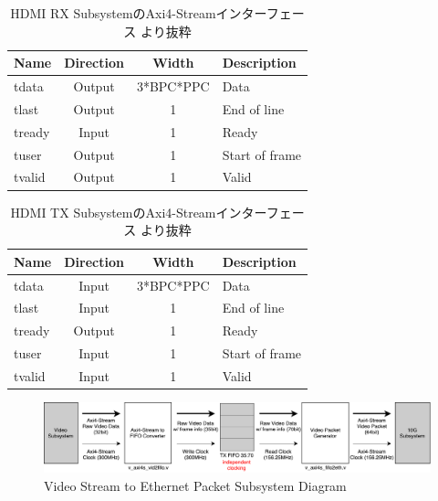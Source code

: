 \begin{table}[htbp]
  \caption{HDMI RX SubsystemのAxi4-Streamインターフェース \cite{xilinx-pg236}より抜粋}
  \label{tb:pg236-vout-axi4-stream}
  \begin{center}
  \begin{tabular}{l|c|c|l}
    \hline
    Name   & Direction & Width     & Description \\\hline\hline
    tdata  & Output    & 3*BPC*PPC & Data \\\hline
    tlast  & Output    & 1         & End of line \\\hline
    tready & Input     & 1         & Ready \\\hline
    tuser  & Output    & 1         & Start of frame \\\hline
    tvalid & Output    & 1         & Valid \\\hline
  \end{tabular}\end{center}
\end{table}

\begin{table}[htbp]
  \caption{HDMI TX SubsystemのAxi4-Streamインターフェース \cite{xilinx-pg235}より抜粋}
  \label{tb:pg235-vin-axi4-stream}
  \begin{center}
  \begin{tabular}{l|c|c|l}
    \hline
    Name   & Direction & Width     & Description \\\hline\hline
    tdata  & Input     & 3*BPC*PPC & Data \\\hline
    tlast  & Input     & 1         & End of line \\\hline
    tready & Output    & 1         & Ready \\\hline
    tuser  & Input     & 1         & Start of frame \\\hline
    tvalid & Input     & 1         & Valid \\\hline
  \end{tabular}\end{center}
\end{table}

\begin{figure}[htbp]
    \begin{center}
        \includegraphics[bb=0 0 911 166,width=15.5cm]{img/fpga-video-ethernet-diagram.pdf}
    \end{center}
    \caption{Video Stream to Ethernet Packet Subsystem Diagram}
    \label{fig:fpga-video-ethernet-diagram}
\end{figure}

